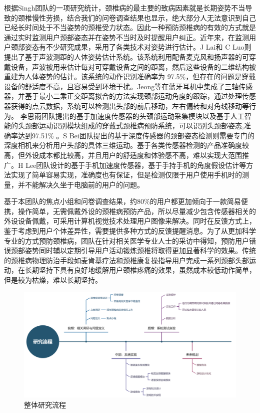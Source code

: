 \documentclass[12pt,a4paper]{article}%
\begin{document}
根据Singh团队的一项研究统计，颈椎病的最主要的致病因素就是长期姿势不当导致的颈椎慢性劳损\cite{singh2014risk}，结合我们的问卷调查结果也显示，绝大部分人无法意识到自己已经长时间处于不当姿势的颈椎受力状态。因此一种预防颈椎病的有效的方式就是通过实时监测用户颈部姿态并在姿势不当时及时提醒用户纠正。近年来，在监测用户颈部姿态有不少研究成果，采用了各类技术对姿势进行估计。J Lai和 C Luo则提出了基于声波测距的人体姿势估计系统。该系统利用配备麦克风和扬声器的可穿戴设备，声波被用来估计每对可穿戴设备之间的距离，然后这些设备的二维结构被重建为人体姿势的估计。该系统的动作识别准确率为 97.5\%，但存在的问题是穿戴设备的舒适度不高，且容易受到环境干扰\cite{lai2021acousticpose}。Jeong等在蓝牙耳机中集成了三轴传感器，并基于最小二乘正交距离拟合的方法实现颈部运动角度的跟踪，通过处理传感器获得的点云数据，系统可以检测出头部的前后移动，左右偏转和对角线移动等行为\cite{jeong2011human}。
李思雨团队提出的基于加速度传感器的头颈部运动采集模块以及基于人工智能的头颈部运动识别模块组成的穿戴式颈椎病预防系统，可以识别头颈部姿态,准确率达到97.51\% \cite{李思雨2020基于人工智能的穿戴式颈椎病预防系统}。S Bei团队提出的基于深度传感器的颈部姿态检测则需要专门的深度相机来分析用户头部的具体三维运动\cite{8284904}。基于各类传感器检测的产品准确度较高，但外设成本都比较高，并且用户的舒适度和体验感不高，难以实现大范围推广。H Lee团队设计的基于手机加速度传感器，基于手持手机的角度假设估计等方法实现了简单容易实现，准确度也有保证，但是检测仅限于用户使用手机时的测量\cite{2013Smart}，并不能解决久坐于电脑前的用户的问题。


基于本团队的焦点小组和问卷调查结果，约80\%的用户都更加倾向于一款简易便携，操作简单，无需佩戴外设的颈椎病预防产品，所以尽量减少包含传感器相关的外设设备佩戴，可采用计算机视觉技术处理用户图像来解决。同时在反馈方式上，鉴于考虑到用户个体差异性，需要提供多种方式的反馈提醒消息。为了从更加科学专业的方式预防颈椎病，团队在针对相关医学专业人士的采访中得知，预防用户错误颈部姿势同时辅以定期引导用户活动锻炼颈椎将取得更加显著科学的效果。传统的颈椎病物理防治手段如麦肯基疗法\cite{傅惠兰2013腹针配合麦肯基疗法治疗颈型颈椎病疗效的临床随机对照研究}和颈椎康复操\cite{朱立国2015颈椎康复操}指导用户完成一系列颈部头部运动，在长期坚持下具有良好地缓解用户颈椎疼痛的效果，虽然成本较低动作简单，但是较为枯燥，难以长期坚持。

\begin{figure}[H]
\centering
\includegraphics[width=.9\textwidth]{./Part3-Design.pic/procedure.png}
\caption{整体研究流程}
\end{figure}
\end{document}
